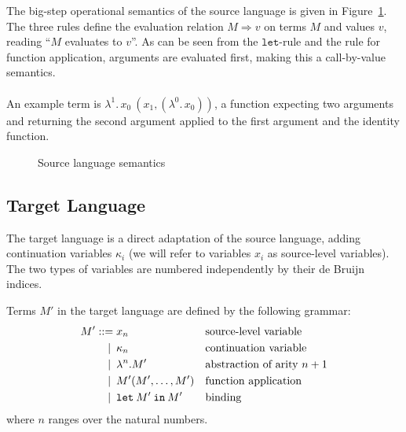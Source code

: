 \documentclass[a4paper,11pt,draft]{article}
\newcommand{\kw}[1]{\mathtt{#1}}
\begin{document}
The big-step operational semantics of the source language is given in
Figure~\ref{fig:sourcesemantics}. The three rules define the evaluation relation
$M \Rightarrow v$ on terms $M$ and values $v$, reading ``$M$ evaluates to $v$''.
As can be seen from the $\kw{let}$-rule and the rule for function application,
arguments are evaluated first, making this a call-by-value semantics.

\paragraph{}

An example term is $\lambda^{1}. \, x_{0} \: (x_{1}, (\lambda^{0}. \, x_{0}))$, a
function expecting two arguments and returning the second argument applied to the
first argument and the identity function.

\begin{figure}
\caption{Source language semantics}
\label{fig:sourcesemantics}
\end{figure}

\subsection{Target Language}

The target language is a direct adaptation of the source language, adding
continuation variables $\kappa_{i}$ (we will refer to variables $x_{i}$
as source-level variables). The two types of variables are numbered
independently by their de Bruijn indices.

Terms $M'$ in the target language are defined by the following grammar:
\begin{align*}
M' ::=            &\; x_{n}
                  && \text{source-level variable} \\
\llap{\textbar\:} &\; \kappa_{n}
                  && \text{continuation variable} \\
\llap{\textbar\:} &\; \lambda^{n}.M'
                  && \text{abstraction of arity $n+1$} \\
\llap{\textbar\:} &\; M'(M', \ldots, M')
                  && \text{function application} \\
\llap{\textbar\:} &\; \kw{let} \: M' \: \kw{in} \: M'
                  && \text{binding}
\end{align*}
where $n$ ranges over the natural numbers.
\end{document}
